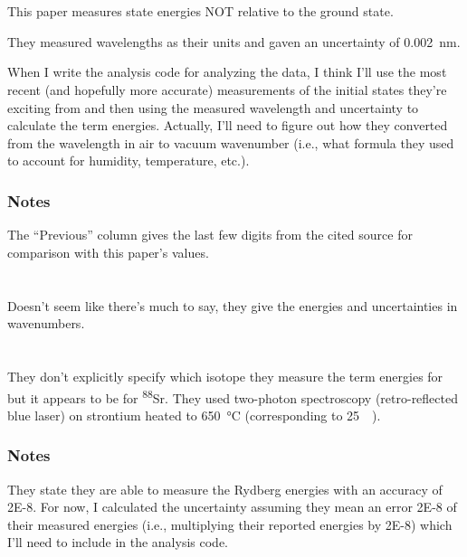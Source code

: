 \documentclass{article}
\newcommand{\tsup}{\textsuperscript}													%
\newcommand{\Sr}[1]{\tsup{#1}\textnormal{Sr}}											%
\begin{document}
\section{}

This paper measures state energies NOT relative to the ground state. 

They measured wavelengths as their units and gaven an uncertainty of \SI{0.002}{\nm}. 

When I write the analysis code for analyzing the data, I think I'll use the most recent (and hopefully more accurate) measurements of the initial states they're exciting from and then using the measured wavelength and uncertainty to calculate the term energies. Actually, I'll need to figure out how they converted from the wavelength in air to vacuum wavenumber (i.e., what formula they used to account for humidity, temperature, etc.). 

\subsubsection{Notes}

The ``Previous'' column gives the last few digits from the cited source for comparison with this paper's values. 

\section{}

Doesn't seem like there's much to say, they give the energies and uncertainties in wavenumbers. 

\section{}

They don't explicitly specify which isotope they measure the term energies for but it appears to be for \Sr{88}. They used two-photon spectroscopy (retro-reflected blue laser) on strontium heated to \SI{650}{\celsius} (corresponding to \SI{25}{\milli\Torr}). 

\subsubsection{Notes}

They state they are able to measure the Rydberg energies with an accuracy of \num{2E-8}. For now, I calculated the uncertainty assuming they mean an error \num{2E-8} of their measured energies (i.e., multiplying their reported energies by \num{2E-8}) which I'll need to include in the analysis code. 
\end{document}
